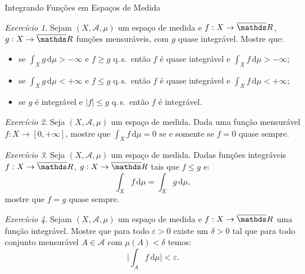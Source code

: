 \documentclass[oneside,final,11pt]{amsbook}
\newcommand{\R}{\mathds R}
\newcommand{\dd}{\mathrm d}
\newcommand{\qs}{\hbox{q.$\,$s.}}
\theoremstyle{remark}\newtheorem{exercise}{Exercício}[chapter]
\theoremstyle{remark}\newtheorem{*exercise}[exercise]{\hbox to 0pt{\hskip 0pt minus 1fil*}Exercício}
\theoremstyle{definition}\newtheorem{exdefin}{Definição}[chapter]
\theoremstyle{plain}\newtheorem{teo}{Teorema}[section]
\theoremstyle{plain}\newtheorem{lem}[teo]{Lema}
\theoremstyle{plain}\newtheorem{prop}[teo]{Proposição}
\theoremstyle{plain}\newtheorem{cor}[teo]{Corolário}
\theoremstyle{definition}\newtheorem{defin}[teo]{Definição}
\theoremstyle{remark}\newtheorem{rem}[teo]{Observação}
\theoremstyle{definition}\newtheorem{notation}[teo]{Notação}
\theoremstyle{definition}\newtheorem{convention}[teo]{Convenção}
\theoremstyle{definition}\newtheorem{example}[teo]{Exemplo}
\numberwithin{section}{chapter}
\numberwithin{equation}{section}
\begin{document}
\begin{chapter}{Integrando Funções em Espaços de Medida}
\begin{exercise}\label{exe:implicaquaseint}
Sejam $(X,\mathcal A,\mu)$ um espaço de medida e $f:X\to\overline\R$, $g:X\to\overline\R$ funções mensuráveis,
com $g$ quase integrável. Mostre que:
\begin{itemize}
\item se $\int_Xg\,\dd\mu>-\infty$ e $f\ge g$ \qs\ então $f$ é quase integrável e $\int_Xf\,\dd\mu>-\infty$;
\item se $\int_Xg\,\dd\mu<+\infty$ e $f\le g$ \qs\ então $f$ é quase integrável e $\int_Xf\,\dd\mu<+\infty$;
\item se $g$ é integrável e $\vert f\vert\le g$ \qs\ então $f$ é integrável.
\end{itemize}
\end{exercise}

\begin{exercise}\label{exe:intzerofzeroqs}
Seja $(X,\mathcal A,\mu)$ um espaço de medida. Dada uma função mensurável
$f:X\to[0,+\infty]$, mostre que $\int_Xf\,\dd\mu=0$ se e somente se $f=0$ quase sempre.
\end{exercise}

\begin{exercise}\label{exe:flegintigualqs}
Seja $(X,\mathcal A,\mu)$ um espaço de medida. Dadas funções integráveis
$f:X\to\overline\R$, $g:X\to\overline\R$ tais que $f\le g$ e:
\[\int_Xf\,\dd\mu=\int_Xg\,\dd\mu,\]
mostre que $f=g$ quase sempre.
\end{exercise}

\begin{exercise}
Sejam $(X,\mathcal A,\mu)$ um espaço de medida e $f:X\to\overline\R$ uma função
integrável. Mostre que para todo $\varepsilon>0$ existe um $\delta>0$ tal que para
todo conjunto mensurável $A\in\mathcal A$ com $\mu(A)<\delta$ temos:
\[\Big\vert\int_Af\,\dd\mu\Big\vert<\varepsilon.\]
\end{exercise}


\end{chapter}
\end{document}
